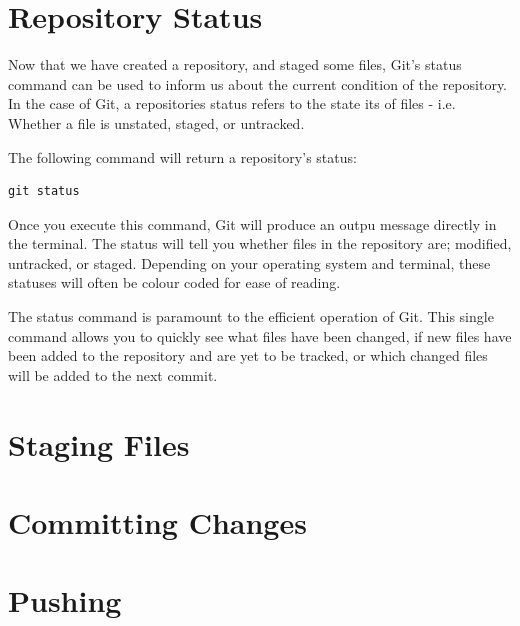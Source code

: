 \documentclass[11pt, a4paper, titlepage]{article}
\begin{document}
\section{Repository Status}
Now that we have created a repository, and staged some files, Git's status
command can be used to inform us about the current condition of the repository.
In the case of Git, a repositories status refers to the state its of files -
i.e.  Whether a file is unstated, staged, or untracked.

The following command will return a repository's status:

\begin{lstlisting}[label=lst_status,
caption=Initialisin a new Git repository]
 git status
\end{lstlisting}
Once you execute this command, Git will produce an outpu message directly in
the terminal.
The status will tell you whether files in the repository are; modified,
untracked, or staged.
Depending on your operating system and terminal, these statuses will often be
colour coded for ease of reading.

The status command is paramount to the efficient operation of Git.
This single command allows you to quickly see what files have been changed, if
new files have been added to the repository and are yet to be tracked, or which
changed files will be added to the next commit.


\section{Staging Files}



\section{Committing Changes}



\section{Pushing}
\end{document}
